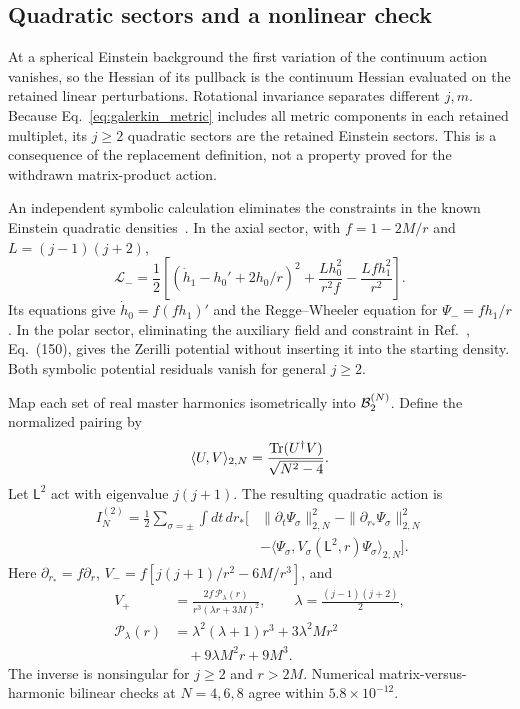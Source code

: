 \subsection{Quadratic sectors and a nonlinear check}

At a spherical Einstein background the first variation of the continuum action vanishes, so the Hessian of its pullback is the continuum Hessian evaluated on the retained linear perturbations. Rotational invariance separates different $j,m$. Because Eq.~\eqref{eq:galerkin_metric} includes all metric components in each retained multiplet, its $j\ge2$ quadratic sectors are the retained Einstein sectors. This is a consequence of the replacement definition, not a property proved for the withdrawn matrix-product action.

An independent symbolic calculation eliminates the constraints in the known Einstein quadratic densities~\cite{Solomon2023}. In the axial sector, with $f=1-2M/r$ and $L=(j-1)(j+2)$,
\begin{equation}
\mathcal L_- =\frac12\left[(\dot h_1-h_0'+2h_0/r)^2
+\frac{Lh_0^2}{r^2f}-\frac{Lf h_1^2}{r^2}\right].
\end{equation}
Its equations give $\dot h_0=f(fh_1)'$ and the Regge--Wheeler equation for $\Psi_-=fh_1/r$. In the polar sector, eliminating the auxiliary field and constraint in Ref.~\cite{Solomon2023}, Eq.~(150), gives the Zerilli potential without inserting it into the starting density. Both symbolic potential residuals vanish for general $j\ge2$.

Map each set of real master harmonics isometrically into $\mathcal{B}_2^{(N)}$. Define the normalized pairing by
\begin{equation}
\langle U,V\rangle_{2,N}=\frac{\mathrm{Tr}(U^\dagger V)}{\sqrt{N^2-4}}.
\end{equation}
Let $\mathsf L^2$ act with eigenvalue $j(j+1)$. The resulting quadratic action is
\begin{align}\label{eq:quadratic_matrix_action}
I_N^{(2)}=\frac12\sum_{\sigma=\pm}\int dt\,dr_*\Big[&
\|\partial_t\Psi_\sigma\|_{2,N}^2-\|\partial_{r_*}\Psi_\sigma\|_{2,N}^2\nonumber\\
&-\langle\Psi_\sigma,V_\sigma(\mathsf L^2,r)\Psi_\sigma\rangle_{2,N}\Big].
\end{align}
Here $\partial_{r_*}=f\partial_r$, $V_-=f[j(j+1)/r^2-6M/r^3]$, and
\begin{align}
V_+&=\frac{2f\,\mathcal P_\lambda(r)}{r^3(\lambda r+3M)^2},\qquad
\lambda=\frac{(j-1)(j+2)}2,\nonumber\\
\mathcal P_\lambda(r)&=\lambda^2(\lambda+1)r^3+3\lambda^2Mr^2\nonumber\\
&\quad+9\lambda M^2r+9M^3.
\end{align}
The inverse is nonsingular for $j\ge2$ and $r>2M$. Numerical matrix-versus-harmonic bilinear checks at $N=4,6,8$ agree within $5.8\times10^{-12}$.

